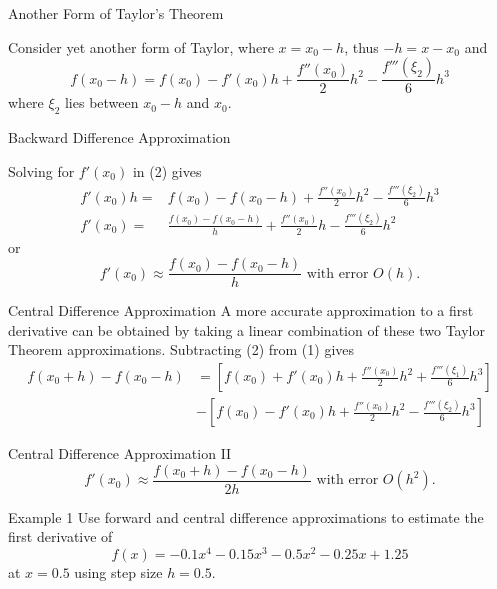 \documentclass[12pt]{beamer}
\begin{document}
\begin{frame}{Another Form of Taylor's Theorem}

Consider yet another form of Taylor, where $x=x_0-h$, thus $-h=x-x_0$ and
\begin{equation}
f(x_0-h) = f(x_0) - f'(x_0)h + \frac{f''(x_0)}{2}h^2 - \frac{f'''(\xi_2)}{6}h^3
\end{equation}
where $\xi_2$ lies between $x_0-h$ and $x_0$.

\end{frame}

\begin{frame}{Backward Difference Approximation}

Solving for $f'(x_0)$ in (2) gives
\begin{align*}
f'(x_0)h =& f(x_0) - f(x_0-h) + \frac{f''(x_0)}{2}h^2 - \frac{f'''(\xi_2)}{6}h^3 \\
f'(x_0) =& \frac{f(x_0) - f(x_0-h)}{h} + \frac{f''(x_0)}{2}h - \frac{f'''(\xi_2)}{6}h^2
\end{align*}
or
\[
f'(x_0) \approx \frac{f(x_0) - f(x_0-h)}{h} \text{ with error } O(h).
\]


\end{frame}

\begin{frame}{Central Difference Approximation}
A more accurate approximation to a first derivative can be obtained by taking a linear combination of these two Taylor Theorem approximations.
Subtracting (2) from (1) gives
\begin{align*}
f(x_0+h)-f(x_0-h)&=\left[f(x_0) + f'(x_0)h + \frac{f''(x_0)}{2}h^2 + \frac{f'''(\xi_1)}{6}h^3\right] \\
&-\left[f(x_0) - f'(x_0)h + \frac{f''(x_0)}{2}h^2 - \frac{f'''(\xi_2)}{6}h^3\right]
\end{align*}
\vspace{1 in}
\end{frame}

\begin{frame}{Central Difference Approximation II}
\vspace{2 in}
\[
f'(x_0) \approx \frac{f(x_0+h) - f(x_0-h)}{2h} \text{ with error } O(h^2).
\]
\end{frame}

\begin{frame}{Example 1}
Use forward and central difference approximations to estimate the first derivative of
\[
f(x)=-0.1x^4-0.15x^3-0.5x^2-0.25x+1.25
\]
at $x=0.5$ using step size $h=0.5$.
\vspace{3 in}
\end{frame}
\end{document}
